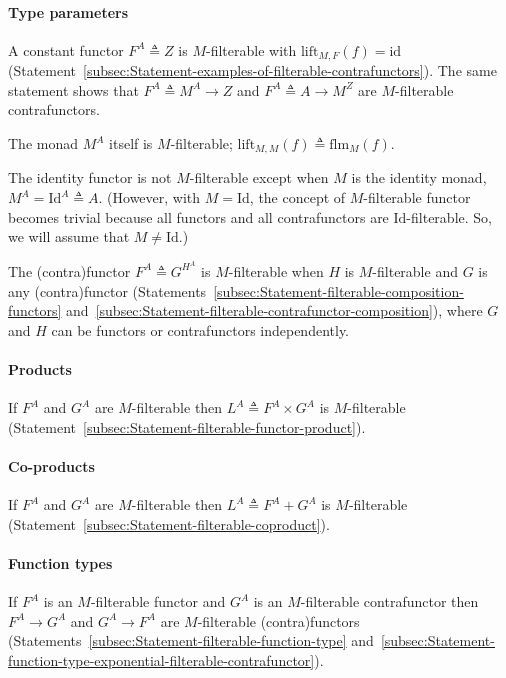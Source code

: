 \paragraph{Type parameters}

A constant functor $F^{A}\triangleq Z$ is $M$-filterable with $\text{lift}_{M,F}(f)=\text{id}$
(Statement~\ref{subsec:Statement-examples-of-filterable-contrafunctors}).
The same statement shows that $F^{A}\triangleq M^{A}\rightarrow Z$
and $F^{A}\triangleq A\rightarrow M^{Z}$ are $M$-filterable contrafunctors.

The monad $M^{A}$ itself is $M$-filterable; $\text{lift}_{M,M}(f)\triangleq\text{flm}_{M}(f)$.

The identity functor is not $M$-filterable except when $M$ is the
identity monad, $M^{A}=\text{Id}^{A}\triangleq A$. (However, with
$M=\text{Id}$, the concept of $M$-filterable functor becomes trivial
because all functors and all contrafunctors are $\text{Id}$-filterable.
So, we will assume that $M\neq\text{Id}$.)

The (contra)functor $F^{A}\triangleq G^{H^{A}}$ is $M$-filterable
when $H$ is $M$-filterable and $G$ is any (contra)functor (Statements~\ref{subsec:Statement-filterable-composition-functors}
and~\ref{subsec:Statement-filterable-contrafunctor-composition}),
where $G$ and $H$ can be functors or contrafunctors independently.

\paragraph{Products}

If $F^{A}$ and $G^{A}$ are $M$-filterable then $L^{A}\triangleq F^{A}\times G^{A}$
is $M$-filterable (Statement~\ref{subsec:Statement-filterable-functor-product}).

\paragraph{Co-products}

If $F^{A}$ and $G^{A}$ are $M$-filterable then $L^{A}\triangleq F^{A}+G^{A}$
is $M$-filterable (Statement~\ref{subsec:Statement-filterable-coproduct}).

\paragraph{Function types}

If $F^{A}$ is an $M$-filterable functor and $G^{A}$ is an $M$-filterable
contrafunctor then $F^{A}\rightarrow G^{A}$ and $G^{A}\rightarrow F^{A}$
are $M$-filterable (contra)functors (Statements~\ref{subsec:Statement-filterable-function-type}
and~\ref{subsec:Statement-function-type-exponential-filterable-contrafunctor}).

